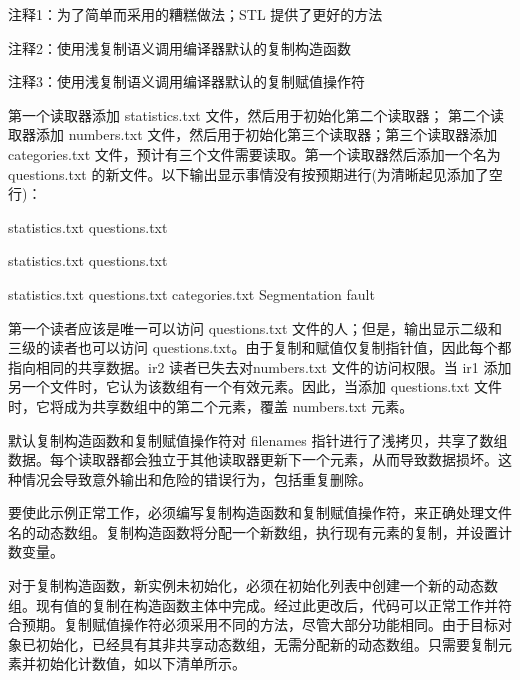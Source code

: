 {\footnotesize
注释1：为了简单而采用的糟糕做法；STL 提供了更好的方法

注释2：使用浅复制语义调用编译器默认的复制构造函数

注释3：使用浅复制语义调用编译器默认的复制赋值操作符
}


第一个读取器添加 statistics.txt 文件，然后用于初始化第二个读取器； 第二个读取器添加 numbers.txt 文件，然后用于初始化第三个读取器；第三个读取器添加 categories.txt 文件，预计有三个文件需要读取。第一个读取器然后添加一个名为 questions.txt 的新文件。以下输出显示事情没有按预期进行(为清晰起见添加了空行)：

\begin{shell}
statistics.txt
questions.txt

statistics.txt
questions.txt

statistics.txt
questions.txt
categories.txt
Segmentation fault
\end{shell}

第一个读者应该是唯一可以访问 questions.txt 文件的人；但是，输出显示二级和三级的读者也可以访问 questions.txt。由于复制和赋值仅复制指针值，因此每个都指向相同的共享数据。ir2 读者已失去对numbers.txt 文件的访问权限。当 ir1 添加另一个文件时，它认为该数组有一个有效元素。因此，当添加 questions.txt 文件时，它将成为共享数组中的第二个元素，覆盖 numbers.txt 元素。

默认复制构造函数和复制赋值操作符对 filenames 指针进行了浅拷贝，共享了数组数据。每个读取器都会独立于其他读取器更新下一个元素，从而导致数据损坏。这种情况会导致意外输出和危险的错误行为，包括重复删除。


要使此示例正常工作，必须编写复制构造函数和复制赋值操作符，来正确处理文件名的动态数组。复制构造函数将分配一个新数组，执行现有元素的复制，并设置计数变量。

对于复制构造函数，新实例未初始化，必须在初始化列表中创建一个新的动态数组。现有值的复制在构造函数主体中完成。经过此更改后，代码可以正常工作并符合预期。复制赋值操作符必须采用不同的方法，尽管大部分功能相同。由于目标对象已初始化，已经具有其非共享动态数组，无需分配新的动态数组。只需要复制元素并初始化计数值，如以下清单所示。


